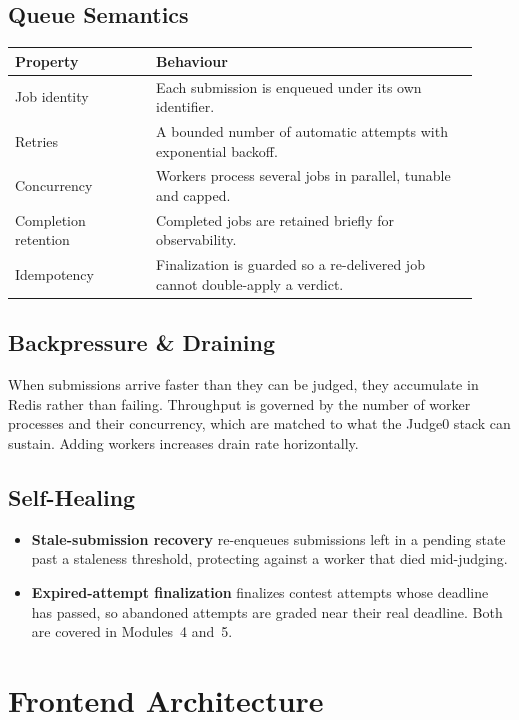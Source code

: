 \documentclass[12pt,a4paper,oneside]{report}
\begin{document}
\section{Queue Semantics}
\begin{longtable}{@{}p{0.28\linewidth} p{0.64\linewidth}@{}}
\toprule
\textbf{Property} & \textbf{Behaviour}\\
\midrule
\endhead
Job identity & Each submission is enqueued under its own identifier.\\
Retries & A bounded number of automatic attempts with exponential backoff.\\
Concurrency & Workers process several jobs in parallel, tunable and capped.\\
Completion retention & Completed jobs are retained briefly for observability.\\
Idempotency & Finalization is guarded so a re-delivered job cannot double-apply a verdict.\\
\bottomrule
\end{longtable}

\section{Backpressure \& Draining}
When submissions arrive faster than they can be judged, they accumulate in Redis
rather than failing. Throughput is governed by the number of worker processes and
their concurrency, which are matched to what the Judge0 stack can sustain. Adding
workers increases drain rate horizontally.

\section{Self-Healing}
\begin{itemize}[leftmargin=1.5em]
  \item \textbf{Stale-submission recovery} re-enqueues submissions left in a
        pending state past a staleness threshold, protecting against a worker
        that died mid-judging.
  \item \textbf{Expired-attempt finalization} finalizes contest attempts whose
        deadline has passed, so abandoned attempts are graded near their real
        deadline. Both are covered in Modules~4 and~5.
\end{itemize}

\chapter{Frontend Architecture}
\end{document}
